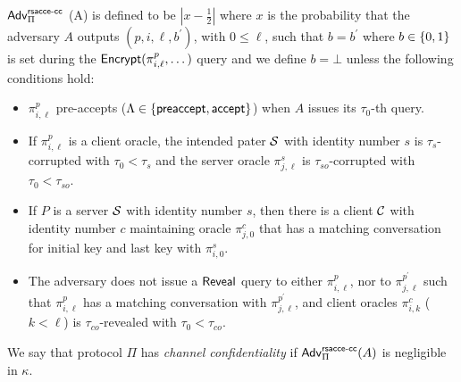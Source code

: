 \begin{definition} \label{def:rsacce-cc}
 $\mathsf{Adv}^{\mathsf{rsacce\textsc{-} cc}}_{\Pi}$ (A) is defined to be
 $|x - \frac{1}{2}|$ where $x$ is the probability that
 the adversary $A$ outputs $(p, i, \ell, b^{\prime})$,
 with $0\leq \ell$, such that $b = b^{\prime}$ where
 $b \in \{0,1\}$ is set during the
 $\mathsf{Encrypt}(\pi^p_{i,\ell},\dots)$ query and we define
 $b=\bot$ unless the following conditions hold:
 \begin{itemize}
  \item{$\pi^p_{i,\ell}$ pre-accepts
  ($\Lambda \in \{\mathsf{preaccept}, \mathsf{accept} \}$) when $A$
  issues its $\tau_0$-th query.}

  \item{If $\pi^p_{i,\ell}$ is a client oracle, the
  intended pater $\mathcal{S}$ with identity number $s$ is $\tau_s$-corrupted
  with $\tau_0 < \tau_s$ and the server oracle $\pi^s_{j,\ell}$ is
  $\tau_{so}$-corrupted with $\tau_0 < \tau_{so}$.}

  \item{If $P$ is a server $\mathcal{S}$ with identity number $s$, then there
  is a client $\mathcal{C}$ with identity number $c$ maintaining oracle
  $\pi^c_{j,0}$ that has a matching conversation for initial key and
  last key with $\pi^s_{i,0}$.}

  \item{The adversary does not issue a $\mathsf{Reveal}$ query
  to either $\pi^p_{i,\ell}$, nor to
  $\pi^{p^{\prime}}_{j,\ell}$ such that $\pi^p_{i,\ell}$
  has a matching conversation with
  $\pi^{p^{\prime}}_{j,\ell}$, and client oracles $\pi^c_{i,k}$
  ($k < \ell$) is $\tau_{co}$-revealed with $\tau_0 < \tau_{co}$.}
 \end{itemize}
 We say that protocol $\Pi$ has
 \textit{channel confidentiality} if
 $\mathsf{Adv}^{\mathsf{rsacce\textsc{-} cc}}_{\Pi}(A)$ is negligible in $\kappa$.
\end{definition}

